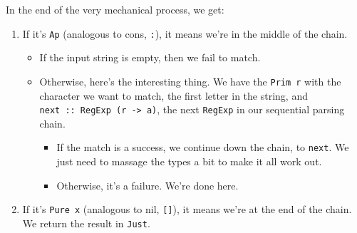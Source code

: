 \documentclass[]{article}
\newenvironment{Shaded}{}{}
\newcommand{\CommentTok}[1]{\textcolor[rgb]{0.38,0.63,0.69}{\textit{#1}}}
\newcommand{\DataTypeTok}[1]{\textcolor[rgb]{0.56,0.13,0.00}{#1}}
\newcommand{\FunctionTok}[1]{\textcolor[rgb]{0.02,0.16,0.49}{#1}}
\newcommand{\KeywordTok}[1]{\textcolor[rgb]{0.00,0.44,0.13}{\textbf{#1}}}
\newcommand{\NormalTok}[1]{#1}
\newcommand{\OperatorTok}[1]{\textcolor[rgb]{0.40,0.40,0.40}{#1}}
\newcommand{\OtherTok}[1]{\textcolor[rgb]{0.00,0.44,0.13}{#1}}
\begin{document}
In the end of the very mechanical process, we get:

\begin{Shaded}
\end{Shaded}

\begin{enumerate}
\def\labelenumi{\arabic{enumi}.}
\item
  If it's \texttt{Ap} (analogous to cons, \texttt{:}), it means we're in the
  middle of the chain.

  \begin{itemize}
  \tightlist
  \item
    If the input string is empty, then we fail to match.
  \item
    Otherwise, here's the interesting thing. We have the \texttt{Prim\ r} with
    the character we want to match, the first letter in the string, and
    \texttt{next\ ::\ RegExp\ (r\ -\textgreater{}\ a)}, the next \texttt{RegExp}
    in our sequential parsing chain.

    \begin{itemize}
    \tightlist
    \item
      If the match is a success, we continue down the chain, to \texttt{next}.
      We just need to massage the types a bit to make it all work out.
    \item
      Otherwise, it's a failure. We're done here.
    \end{itemize}
  \end{itemize}
\item
  If it's \texttt{Pure\ x} (analogous to nil, \texttt{{[}{]}}), it means we're
  at the end of the chain. We return the result in \texttt{Just}.
\end{enumerate}
\end{document}
